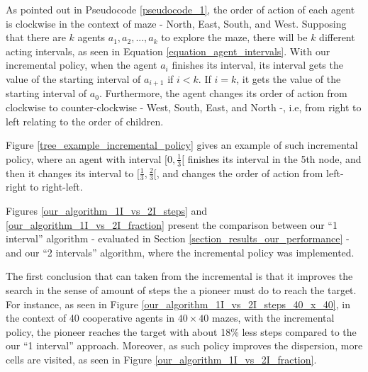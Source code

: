 As pointed out in Pseudocode \ref{pseudocode_1}, the order of action of each agent is clockwise in the context of maze - North, East, South, and West. Supposing that there are $k$ agents $a_{1}, a_{2},...,a_{k}$ to explore the maze, there will be $k$ different acting intervals, as seen in Equation \ref{equation_agent_intervals}. With our incremental policy, when the agent $a_{i}$ finishes its interval, its interval gets the value of the starting interval of $a_{i+1}$ if $i < k$. If $i = k$, it gets the value of the starting interval of $a_{0}$. Furthermore, the agent changes its order of action from clockwise to counter-clockwise - West, South, East, and North -, i.e, from right to left relating to the order of children.

Figure \ref{tree_example_incremental_policy} gives an example of such incremental policy, where an agent with interval $[0, \frac{1}{3}[$ finishes its interval in the 5th node, and then it changes its interval to $[\frac{1}{3}, \frac{2}{3}[$, and changes the order of action from left-right to right-left.

Figures \ref{our_algorithm_1I_vs_2I_steps} and \ref{our_algorithm_1I_vs_2I_fraction} present the comparison between our ``1 interval'' algorithm - evaluated in Section \ref{section_results_our_performance} - and our ``2 intervals'' algorithm, where the incremental policy was implemented.

The first conclusion that can taken from the incremental is that it improves the search in the sense of amount of steps the a pioneer must do to reach the target. For instance, as seen in Figure \ref{our_algorithm_1I_vs_2I_steps_40_x_40}, in the context of 40 cooperative agents in $40 \times 40$ mazes, with the incremental policy, the pioneer reaches the target with about 18\% less steps compared to the our ``1 interval'' approach. Moreover, as such policy improves the dispersion, more cells are visited, as seen in Figure \ref{our_algorithm_1I_vs_2I_fraction}.

